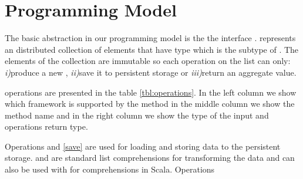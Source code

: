 \section{Programming Model}
\label{sec:programming-model}

The basic abstraction in our programming model is the the interface .  represents an distributed collection of elements that have type  which is the subtype of . The elements of the  collection are immutable so each operation on the list can only: \emph{i)}produce a new , \emph{ii)}save it to persistent storage or \emph{iii)}return an aggregate value. 

 operations are presented in the table \ref{tbl:operations}. In the left column we show which framework is supported by the method in the middle column we show the method name and in the right column we show the type of the input  and operations return type. 

Operations  and \ref{save} are used for loading and storing data to the persistent storage.  and  are standard list comprehensions for transforming the data and can also be used with for comprehensions in Scala. Operations   


